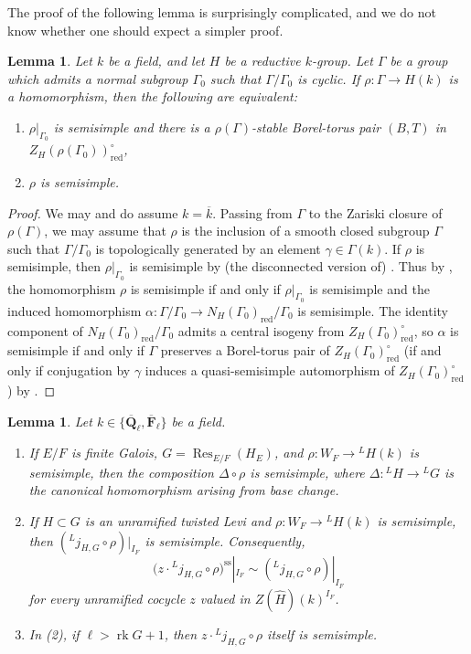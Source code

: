 \documentclass[reqno]{amsart}
\numberwithin{equation}{subsection}
\newcommand{\F}{\mathbf{F}}
\newcommand{\Q}{\mathbf{Q}}
\newcommand{\ol}[1]{\overline{#1}}
\newcommand{\wh}[1]{\widehat{#1}}
\newcommand{\co}{\colon}
\newcommand{\ld}{{}^L}
\DeclareMathOperator{\Res}{Res}
\DeclareMathOperator{\red}{red}
\DeclareMathOperator{\rk}{rk}
\renewcommand{\ss}{\mathrm{ss}}
\newtheorem{lemma}[thm]{Lemma}
\theoremstyle{remark}
\numberwithin{equation}{subsection}
\numberwithin{figure}{subsection}
\begin{document}
The proof of the following lemma is surprisingly complicated, and we do not know whether one should expect a simpler proof.

\begin{lemma}\label{lemma:general-semisimplicity-criterion}
Let $k$ be a field, and let $H$ be a reductive $k$-group. Let $\Gamma$ be a group which admits a normal subgroup $\Gamma_0$ such that $\Gamma/\Gamma_0$ is cyclic. If $\rho\co \Gamma \to H(k)$ is a homomorphism, then the following are equivalent:
\begin{enumerate}
    \item $\rho|_{\Gamma_0}$ is semisimple and there is a $\rho(\Gamma)$-stable Borel-torus pair $(B, T)$ in $Z_H(\rho(\Gamma_0))^\circ_{\red}$,
    \item $\rho$ is semisimple.
\end{enumerate}
\end{lemma}

\begin{proof}
We may and do assume $k = \ol k$. Passing from $\Gamma$ to the Zariski closure of $\rho(\Gamma)$, we may assume that $\rho$ is the inclusion of a smooth closed subgroup $\Gamma$ such that $\Gamma/\Gamma_0$ is topologically generated by an element $\gamma \in \Gamma(k)$. If $\rho$ is semisimple, then $\rho|_{\Gamma_0}$ is semisimple by (the disconnected version of) \cite[Theorem 3.10]{BMR05}. Thus by \cite[Corollary 3.7]{BMR08}, the homomorphism $\rho$ is semisimple if and only if $\rho|_{\Gamma_0}$ is semisimple and the induced homomorphism $\alpha\co \Gamma/\Gamma_0 \to N_H(\Gamma_0)_{\red}/\Gamma_0$ is semisimple. The identity component of $N_H(\Gamma_0)_{\red}/\Gamma_0$ admits a central isogeny from $Z_H(\Gamma_0)^\circ_{\red}$, so $\alpha$ is semisimple if and only if $\Gamma$ preserves a Borel-torus pair of $Z_H(\Gamma_0)^\circ_{\red}$ (if and only if conjugation by $\gamma$ induces a quasi-semisimple automorphism of $Z_H(\Gamma_0)^\circ_{\red}$) by \cite[Proposition 3]{Spr06}.
\end{proof}

\begin{lemma}\label{lemma:functorial-semisimplicity}
Let $k \in \{\ol\Q_\ell, \ol\F_\ell\}$ be a field.
\begin{enumerate}
\item If $E/F$ is finite Galois, $G=\Res_{E/F}(H_E)$, and $\rho\co W_F\to\ld H(k)$ is semisimple, then the composition $\Delta \circ \rho$ is semisimple, where $\Delta\co \ld H\to\ld G$ is the canonical homomorphism arising from base change.
\item If $H\subset G$ is an unramified twisted Levi and $\rho\co W_F\to\ld H(k)$ is semisimple, then $(\ld j_{H,G}\circ\rho)|_{I_F}$ is semisimple. Consequently,
\[
\bigl(z\cdot\ld j_{H,G}\circ\rho\bigr)^{\ss}|_{I_F}
\sim (\ld j_{H,G}\circ\rho)|_{I_F}
\]
for every unramified cocycle $z$ valued in $Z(\wh H)(k)^{I_F}$.
\item In (2), if $\ell>\rk G+1$, then $z\cdot\ld j_{H,G}\circ\rho$ itself is semisimple.
\end{enumerate}
\end{lemma}
\end{document}
